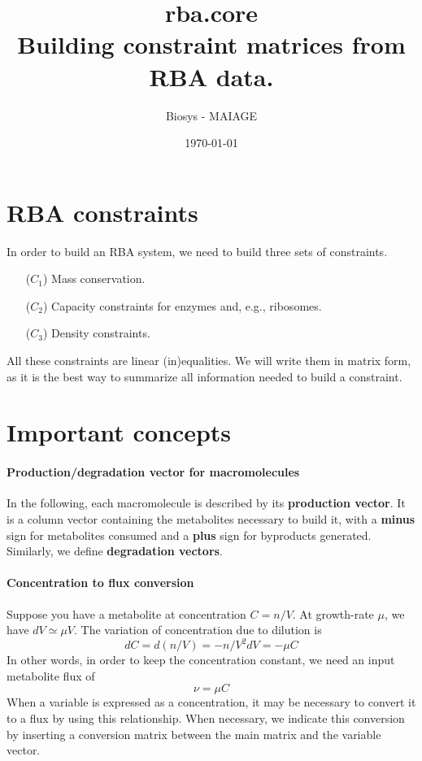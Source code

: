 \documentclass[12pt]{scrartcl}
\theoremstyle{definition}
\theoremstyle{remark}
\numberwithin{equation}{section}
\begin{document}
\title{rba.core\\ Building constraint matrices from RBA data.}%
\author{Biosys - MAIAGE}%
\date{\today}%

\maketitle

\newpage

\tableofcontents

\newpage

\section{RBA constraints}

In order to build an RBA system, we need to build three sets of constraints.

\begin{itemize}
  \item[($C_1$)] Mass conservation.
  \item[($C_2$)] Capacity constraints for enzymes and, e.g., ribosomes.
  \item[($C_3$)] Density constraints.
\end{itemize}

All these constraints are linear (in)equalities.
We will write them in matrix form, as it is the best way to summarize
all information needed to build a constraint.

\section{Important concepts}

\paragraph{Production/degradation vector for macromolecules}
In the following, each macromolecule is described by its \textbf{production vector}.
It is a column vector containing the metabolites necessary to build it,
with a \textbf{minus} sign for metabolites consumed and a \textbf{plus} sign for byproducts generated.
Similarly, we define \textbf{degradation vectors}.

\paragraph{Concentration to flux conversion}
Suppose you have a metabolite at concentration $C = n/V$.
At growth-rate $\mu$, we have $dV \simeq \mu V$.
The variation of concentration due to dilution is
\[
  dC = d(n/V) = -n/V^2 dV = -\mu C
\]
In other words, in order to keep the concentration constant,
we need an input metabolite flux of
\[
  \nu = \mu C
\]
When a variable is expressed as a concentration, it may be necessary to
convert it to a flux by using this relationship.
When necessary, we indicate this conversion by inserting a conversion
matrix between the main matrix and the variable vector.
\end{document}
